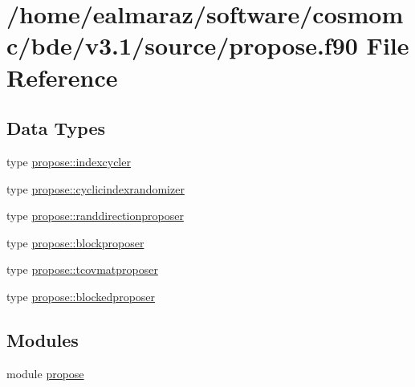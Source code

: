 \hypertarget{propose_8f90}{}\section{/home/ealmaraz/software/cosmomc/bde/v3.1/source/propose.f90 File Reference}
\label{propose_8f90}
\subsection*{Data Types}
\begin{DoxyCompactItemize}
\item 
type \mbox{\hyperlink{structpropose_1_1indexcycler}{propose\+::indexcycler}}
\item 
type \mbox{\hyperlink{structpropose_1_1cyclicindexrandomizer}{propose\+::cyclicindexrandomizer}}
\item 
type \mbox{\hyperlink{structpropose_1_1randdirectionproposer}{propose\+::randdirectionproposer}}
\item 
type \mbox{\hyperlink{structpropose_1_1blockproposer}{propose\+::blockproposer}}
\item 
type \mbox{\hyperlink{structpropose_1_1tcovmatproposer}{propose\+::tcovmatproposer}}
\item 
type \mbox{\hyperlink{structpropose_1_1blockedproposer}{propose\+::blockedproposer}}
\end{DoxyCompactItemize}
\subsection*{Modules}
\begin{DoxyCompactItemize}
\item 
module \mbox{\hyperlink{namespacepropose}{propose}}
\end{DoxyCompactItemize}
